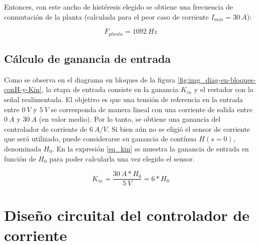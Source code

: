 Entonces, con este ancho de histéresis elegido se obtiene una frecuencia de conmutación de la planta (calculada para el peor caso de corriente $I_{min}=30\:A$):

\begin{equation} \label{eq_fplanta}
	F_{planta}=1092\:Hz
\end{equation}

\subsection{Cálculo de ganancia de entrada}

Como se observa en el diagrama en bloques de la figura \ref{fig:img_diag-en-bloques-conH-y-Kin}, la etapa de entrada consiste en la ganancia $K_{in}$ y el restador con la señal realimentada. El objetivo es que una tensión de referencia en la entrada entre $0\:V$ y $5\:V$ se corresponda de manera lineal con una corriente de salida entre $0\:A$ y $30\:A$ (en valor medio). Por lo tanto, se obtiene una ganancia del controlador de corriente de $6\:A/V$. Si bien aún no se eligió el sensor de corriente que será utilizado, puede considerarse su ganancia de contínua $H(s=0)$, denominada $H_0$. En la expresión \ref{eq_kin} se muestra la ganancia de entrada en función de $H_0$ para poder calcularla una vez elegido el sensor.

\begin{equation} \label{eq_kin}
	K_{in}=\frac{30\:A*H_0}{5\:V}=6*H_0 
\end{equation}

%
%
\section{Diseño circuital del controlador de corriente}

